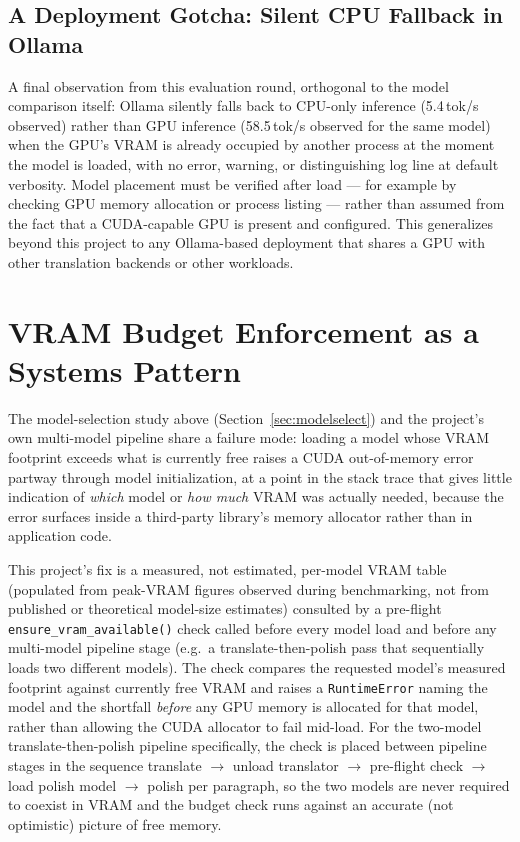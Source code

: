 \documentclass[conference]{IEEEtran}
\begin{document}
\subsection{A Deployment Gotcha: Silent CPU Fallback in Ollama}

A final observation from this evaluation round, orthogonal to the model
comparison itself: Ollama silently falls back to CPU-only inference
(5.4\,tok/s observed) rather than GPU inference (58.5\,tok/s observed for
the same model) when the GPU's VRAM is already occupied by another
process at the moment the model is loaded, with no error, warning, or
distinguishing log line at default verbosity. Model placement must be
verified after load — for example by checking GPU memory allocation or
process listing — rather than assumed from the fact that a CUDA-capable
GPU is present and configured. This generalizes beyond this project to
any Ollama-based deployment that shares a GPU with other translation
backends or other workloads.

\section{VRAM Budget Enforcement as a Systems Pattern}
\label{sec:vram}

The model-selection study above (Section~\ref{sec:modelselect}) and the
project's own multi-model pipeline share a failure mode: loading a model
whose VRAM footprint exceeds what is currently free raises a CUDA
out-of-memory error partway through model initialization, at a point in
the stack trace that gives little indication of \emph{which} model or
\emph{how much} VRAM was actually needed, because the error surfaces
inside a third-party library's memory allocator rather than in
application code.

This project's fix is a measured, not estimated, per-model VRAM table
(populated from peak-VRAM figures observed during benchmarking, not from
published or theoretical model-size estimates) consulted by a pre-flight
\texttt{ensure\_vram\_available()} check called before every model load
and before any multi-model pipeline stage (e.g.\ a translate-then-polish
pass that sequentially loads two different models). The check compares
the requested model's measured footprint against currently free VRAM and
raises a \texttt{RuntimeError} naming the model and the shortfall
\emph{before} any GPU memory is allocated for that model, rather than
allowing the CUDA allocator to fail mid-load. For the two-model
translate-then-polish pipeline specifically, the check is placed between
pipeline stages in the sequence translate $\to$ unload translator $\to$
pre-flight check $\to$ load polish model $\to$ polish per paragraph, so
the two models are never required to coexist in VRAM and the budget check
runs against an accurate (not optimistic) picture of free memory.
\end{document}
